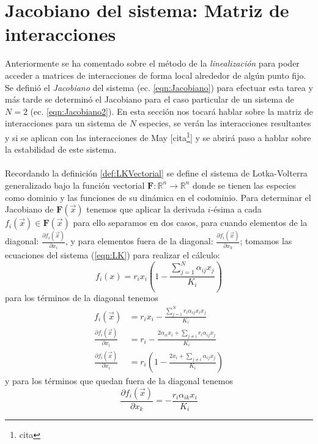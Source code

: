 \section{Jacobiano del sistema: Matriz de interacciones}

Anteriormente se ha comentado sobre el método de la \textit{linealización} para poder acceder a matrices de interacciones de forma local alrededor de algún punto fijo. Se definió el \textit{Jacobiano} del sistema (ec. \ref{eqn:Jacobiano}) para efectuar esta tarea y más tarde se determinó el Jacobiano para el caso particular de un sistema de $N=2$ (ec. \ref{eqn:Jacobiano2}). En esta sección nos tocará hablar sobre la matriz de interacciones para un sistema de $N$ especies, se verán las interacciones resultantes y si se aplican con las interacciones de May [cita\footnote{cita}] y se abrirá paso a hablar sobre la estabilidad de este sistema.\\
\\
Recordando la definición \ref{def:LKVectorial} se define el sistema de Lotka-Volterra generalizado bajo la función vectorial $\mathbf{F}:\mathbb{R}^n\to\mathbb{R}^n$ donde se tienen las especies como dominio y las funciones de su dinámica en el codominio. Para determinar el Jacobiano de $\mathbf{F}(\vec{x})$ tenemos que aplicar la derivada $i$-ésima a cada $f_i(\vec{x})\in\mathbf{F}(\vec{x})$ para ello separamos en dos casos, para cuando elementos de la diagonal: $\frac{\partial f_i(\vec{x})}{\partial x_i}$, y para elementos fuera de la diagonal: $\frac{\partial f_i(\vec{x})}{\partial x_k}$; tomamos las ecuaciones del sistema (\ref{eqn:LK}) para realizar el cálculo:
$$
f_i(x) = r_ix_i\left (1-\frac{\sum_{j=1}^N \alpha_{ij}x_j}{K_i}\right )
$$
para los términos de la diagonal tenemos
\begin{equation}\label{eqn:Jacobiano_ii}
	\begin{split}
			f_i(\vec{x}) &= r_ix_i - \frac{\sum_{j=1}^N r_i\alpha_{ij}x_ix_j}{K_i} \\
			\frac{\partial f_i(\vec{x})}{\partial x_i} &= r_i -
			\frac{2\alpha_{ii}x_i+\sum_{j\neq i} r_i\alpha_{ij}x_j}{K_i}\\
			\frac{\partial f_i(\vec{x})}{\partial x_i} &= r_i \left (1-\frac{2x_i+\sum_{j\neq i}\alpha_{ij}x_j}{K_i}\right )
	\end{split}
\end{equation}
y para los términos que quedan fuera de la diagonal tenemos
\begin{equation}\label{eqn:Jacobiano_ij}
		\frac{\partial f_i(\vec{x})}{\partial x_k} = -\frac{r_i\alpha_{ik}x_i}{K_i} 
\end{equation}
